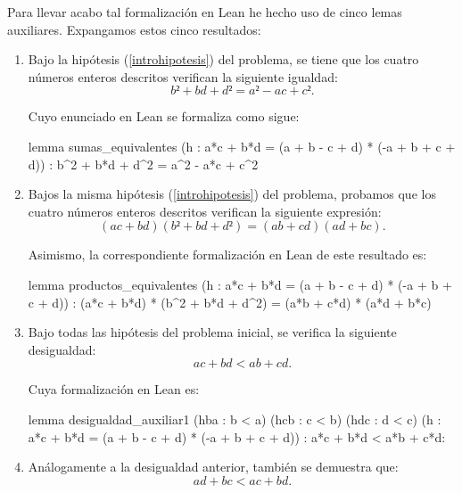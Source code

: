 Para llevar acabo tal formalización en Lean he hecho uso de cinco lemas
auxiliares. Expangamos estos cinco resultados:
\begin{enumerate}
\item Bajo la hipótesis (\ref{introhipotesis}) del problema, se tiene
  que los cuatro números enteros descritos verifican la siguiente
  igualdad:
  \begin{equation*}
    b²+bd+d²=a²-ac+c².
  \end{equation*}

  Cuyo enunciado en Lean se formaliza como sigue:
  \begin{leancode}
  lemma sumas_equivalentes
    (h : a*c + b*d = (a + b - c + d) * (-a + b + c + d))
    : b^2 + b*d + d^2 = a^2 - a*c + c^2
  \end{leancode}

\item Bajos la misma hipótesis (\ref{introhipotesis}) del problema,
  probamos que los cuatro números enteros descritos verifican la
  siguiente expresión:
  \begin{equation*}
    (ac+bd)(b²+bd+d²)=(ab+cd)(ad+bc).
  \end{equation*}

  Asimismo, la correspondiente formalización en Lean de este resultado
  es:
  \begin{leancode}
  lemma productos_equivalentes
    (h : a*c + b*d = (a + b - c + d) * (-a + b + c + d))
    : (a*c + b*d) * (b^2 + b*d + d^2) = (a*b + c*d) * (a*d + b*c)
  \end{leancode}

\item Bajo todas las hipótesis del problema inicial, se verifica la
  siguiente desigualdad:
  \begin{equation*}
    ac+bd<ab+cd.
  \end{equation*}

  Cuya formalización en Lean es:
  \begin{leancode}
  lemma desigualdad_auxiliar1
    (hba : b < a)
    (hcb : c < b)
    (hdc : d < c)
    (h : a*c + b*d = (a + b - c + d) * (-a + b + c + d))
    : a*c + b*d < a*b + c*d:
  \end{leancode}

\item Análogamente a la desigualdad anterior, también se demuestra que:
  \begin{equation*}
    ad+bc<ac+bd.
  \end{equation*}


\end{enumerate}
